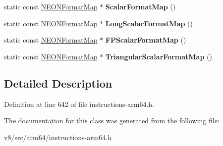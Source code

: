 \begin{DoxyCompactItemize}
static const \mbox{\hyperlink{structv8_1_1internal_1_1NEONFormatMap}{N\+E\+O\+N\+Format\+Map}} $\ast$ {\bfseries Scalar\+Format\+Map} ()
\item 
\mbox{\label{classv8_1_1internal_1_1NEONFormatDecoder_a3dc46401d05486753caf204a6b27ea6b}} 
static const \mbox{\hyperlink{structv8_1_1internal_1_1NEONFormatMap}{N\+E\+O\+N\+Format\+Map}} $\ast$ {\bfseries Long\+Scalar\+Format\+Map} ()
\item 
\mbox{\label{classv8_1_1internal_1_1NEONFormatDecoder_a69f84db081da67ac2617f6dcc62fd261}} 
static const \mbox{\hyperlink{structv8_1_1internal_1_1NEONFormatMap}{N\+E\+O\+N\+Format\+Map}} $\ast$ {\bfseries F\+P\+Scalar\+Format\+Map} ()
\item 
\mbox{\label{classv8_1_1internal_1_1NEONFormatDecoder_a22b0d89011db1fe87c5fb06ed6fb7472}} 
static const \mbox{\hyperlink{structv8_1_1internal_1_1NEONFormatMap}{N\+E\+O\+N\+Format\+Map}} $\ast$ {\bfseries Triangular\+Scalar\+Format\+Map} ()
\end{DoxyCompactItemize}


\subsection{Detailed Description}


Definition at line 642 of file instructions-\/arm64.\+h.



The documentation for this class was generated from the following file\+:\begin{DoxyCompactItemize}
\item 
v8/src/arm64/instructions-\/arm64.\+h\end{DoxyCompactItemize}
